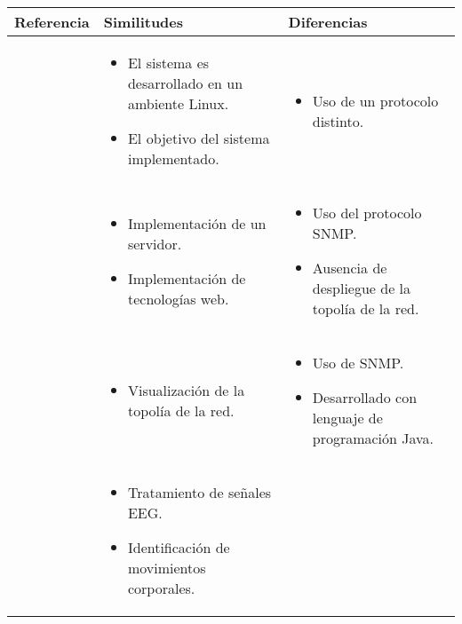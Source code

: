 \newpage
\begin{table}[ht!]
  \begin{tabular}{p{} p{} p{}}
    \toprule
    \textbf{{Referencia}} & \textbf{{Similitudes}} & \textbf{{Diferencias}} \\
    \toprule
    \cite{Rodriguez10} &
    \begin{itemize}[leftmargin=*]
        \item El sistema es desarrollado en un ambiente Linux.
        \item El objetivo del sistema implementado.
    \end{itemize} &
    \begin{itemize}[leftmargin=*]
        \item Uso de un protocolo distinto.
    \end{itemize} \\
    \midrule
    \cite{Garduno11} &
    \begin{itemize}[leftmargin=*]
        \item Implementación de un servidor.
        \item Implementación de tecnologías web.
    \end{itemize} &
    \begin{itemize}[leftmargin=*]
        \item Uso del protocolo SNMP. 
        \item Ausencia de despliegue de la topolía de la red.
    \end{itemize} \\
    \midrule
    \cite{Alcantara15} &
    \begin{itemize}[leftmargin=*]
        \item Visualización de la topolía de la red.
    \end{itemize} &
    \begin{itemize}[leftmargin=*]
        \item Uso de SNMP.
        \item Desarrollado con lenguaje de programación Java.
    \end{itemize} \\
     \midrule
    \cite{Marquez2013} &
    \begin{itemize}[leftmargin=*]
        \item Tratamiento de se\~nales EEG.
        \item Identificaci\'on de movimientos corporales.

\end{itemize}
\end{tabular}
\end{table}
